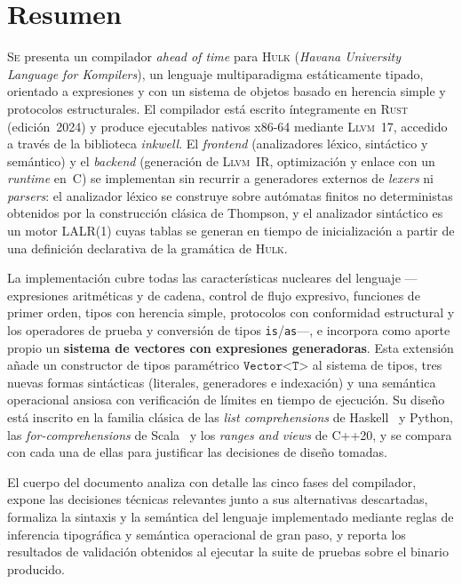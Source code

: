 \documentclass[11pt,a4paper,oneside,openany]{report}
\newcommand{\hulk}{\textsc{Hulk}}
\newcommand{\code}[1]{\texttt{#1}}
\newcommand{\rust}{\textsc{Rust}}
\newcommand{\llvm}{\textsc{Llvm}}
\newcommand{\inkwell}{\textit{inkwell}}
\begin{document}
\thispagestyle{plain}
\chapter*{Resumen}

\lettrine[lines=2,findent=2pt,nindent=0pt]{S}{e} presenta un compilador \textit{ahead
of time} para \hulk{} (\textit{Havana University Language for Kompilers}), un
lenguaje multiparadigma estáticamente tipado, orientado a expresiones y con un
sistema de objetos basado en herencia simple y protocolos estructurales. El
compilador está escrito íntegramente en \rust{} (edición~2024) y produce
ejecutables nativos x86-64 mediante \llvm{}~17, accedido a través de la biblioteca
\inkwell{}. El \textit{frontend} (analizadores léxico, sintáctico y semántico) y
el \textit{backend} (generación de \llvm{}~IR, optimización y enlace con un
\textit{runtime} en~C) se implementan sin recurrir a generadores externos de
\textit{lexers} ni \textit{parsers}: el analizador léxico se construye sobre
autómatas finitos no deterministas obtenidos por la construcción clásica de
Thompson, y el analizador sintáctico es un motor LALR(1) cuyas tablas se generan
en tiempo de inicialización a partir de una definición declarativa de la gramática
de \hulk{}.

La implementación cubre todas las características nucleares del lenguaje
---expresiones aritméticas y de cadena, control de flujo expresivo, funciones de
primer orden, tipos con herencia simple, protocolos con conformidad estructural y
los operadores de prueba y conversión de tipos \code{is}/\code{as}---, e incorpora
como aporte propio un \textbf{sistema de vectores con expresiones generadoras}.
Esta extensión añade un constructor de tipos paramétrico $\code{Vector<T>}$ al
sistema de tipos, tres nuevas formas sintácticas (literales, generadores e
indexación) y una semántica operacional ansiosa con verificación de límites en
tiempo de ejecución. Su diseño está inscrito en la familia clásica de las
\textit{list comprehensions} de Haskell~\cite{peytonjones2003} y Python, las
\textit{for-comprehensions} de Scala~\cite{odersky2008} y los \textit{ranges and
views} de C++20, y se compara con cada una de ellas para justificar las
decisiones de diseño tomadas.

El cuerpo del documento analiza con detalle las cinco fases del compilador,
expone las decisiones técnicas relevantes junto a sus alternativas descartadas,
formaliza la sintaxis y la semántica del lenguaje implementado mediante reglas
de inferencia tipográfica y semántica operacional de gran paso, y reporta los
resultados de validación obtenidos al ejecutar la suite de pruebas sobre el
binario producido.
\end{document}
